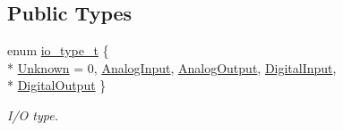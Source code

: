 \subsection*{Public Types}
\begin{DoxyCompactItemize}
\item 
enum \hyperlink{classmdt_tt_test_node_unit_setup_data_a4e69dcc72bebc34d6db64cff91dbfc54}{io\-\_\-type\-\_\-t} \{ \\*
\hyperlink{classmdt_tt_test_node_unit_setup_data_a4e69dcc72bebc34d6db64cff91dbfc54afe3d6b133ce8a6f68baa3325766c6d90}{Unknown} = 0, 
\hyperlink{classmdt_tt_test_node_unit_setup_data_a4e69dcc72bebc34d6db64cff91dbfc54a8e50ceac1dcf82c3003c81b0e7320a36}{Analog\-Input}, 
\hyperlink{classmdt_tt_test_node_unit_setup_data_a4e69dcc72bebc34d6db64cff91dbfc54a69e7d029a1d332f903deed3fa9c790fb}{Analog\-Output}, 
\hyperlink{classmdt_tt_test_node_unit_setup_data_a4e69dcc72bebc34d6db64cff91dbfc54ab77243295dc5311d18f9d2848d92d3ca}{Digital\-Input}, 
\\*
\hyperlink{classmdt_tt_test_node_unit_setup_data_a4e69dcc72bebc34d6db64cff91dbfc54a65bbd79cc1fe21c30b6878d859a16a6f}{Digital\-Output}
 \}
\begin{DoxyCompactList}\small\item\em I/\-O type. \end{DoxyCompactList}\end{DoxyCompactItemize}
